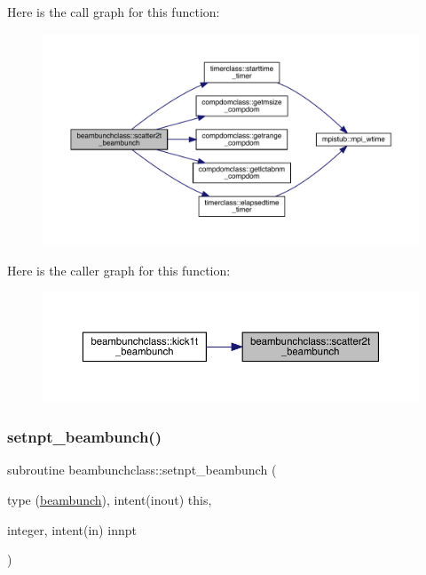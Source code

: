 Here is the call graph for this function\+:\nopagebreak
\begin{figure}[H]
\begin{center}
\leavevmode
\includegraphics[width=350pt]{namespacebeambunchclass_a4353d7ca4b2e80df2e71209df5b0e36c_cgraph}
\end{center}
\end{figure}
Here is the caller graph for this function\+:\nopagebreak
\begin{figure}[H]
\begin{center}
\leavevmode
\includegraphics[width=350pt]{namespacebeambunchclass_a4353d7ca4b2e80df2e71209df5b0e36c_icgraph}
\end{center}
\end{figure}
\mbox{\label{namespacebeambunchclass_af1b14b706bd1283ff6c5a7cec4b06c48}} 
\subsubsection{\texorpdfstring{setnpt\_beambunch()}{setnpt\_beambunch()}}
{\footnotesize\ttfamily subroutine beambunchclass\+::setnpt\+\_\+beambunch (\begin{DoxyParamCaption}\item[{type (\mbox{\hyperlink{namespacebeambunchclass_structbeambunchclass_1_1beambunch}{beambunch}}), intent(inout)}]{this,  }\item[{integer, intent(in)}]{innpt }\end{DoxyParamCaption})}



